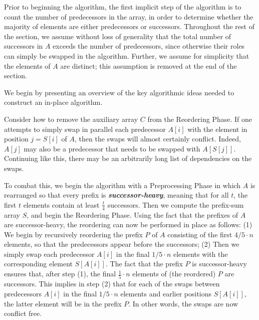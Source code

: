 \documentclass[a4paper,UKenglish,cleveref, autoref, thm-restate]{lipics-v2019}
\newcommand{\defn}[1]{{\textit{\textbf{\boldmath #1}}}}
\renewcommand{\paragraph}[1]{\vspace{0.09in}\noindent{\bf \boldmath #1.}}
\begin{document}
Prior to beginning the algorithm, the first implicit step of the
algorithm is to count the number of predecessors in the array, in
order to determine whether the majority of elements are either
predecessors or successors. Throughout the rest of the section, we
assume without loss of generality that the total number of successors
in $A$ exceeds the number of predecessors, since otherwise their roles
can simply be swapped in the algorithm. Further, we assume for
simplicity that the elements of $A$ are distinct; this assumption is
removed at the end of the section.

\paragraph{Algorithm Outline}
We begin by presenting an overview of the key algorithmic ideas needed
to construct an in-place algorithm.

Consider how to remove the auxiliary array $C$ from the Reordering
Phase. If one attempts to simply swap in parallel each predecessor
$A[i]$ with the element in position $j = S[i]$ of $A$, then the swaps
will almost certainly conflict. Indeed, $A[j]$ may also be a
predecessor that needs to be swapped with $A[S[j]]$. Continuing like
this, there may be an arbitrarily long list of dependencies on the
swaps.

To combat this, we begin the algorithm with a Preprocessing Phase in
which $A$ is rearranged so that every prefix is
\defn{successor-heavy}, meaning that for all $t$, the first $t$
elements contain at least $\frac{t}{4}$ successors. Then we compute
the prefix-sum array $S$, and begin the Reordering Phase. Using the
fact that the prefixes of $A$ are successor-heavy, the reordering can
now be performed in place as follows: (1) We begin by recursively
reordering the prefix $P$ of $A$ consisting of the first $4/5 \cdot n$
elements, so that the predecessors appear before the successors; (2)
Then we simply swap each predecessor $A[i]$ in the final $1/5 \cdot n$
elements with the corresponding element $S[A[i]]$. The fact that the
prefix $P$ is successor-heavy ensures that, after step (1), the final 
$\frac{1}{5} \cdot n$ elements of (the reordered) $P$ are successors. 
This implies in step (2) that for each of the swaps between predecessors $A[i]$
in the final $1/5 \cdot n$ elements and earlier positions $S[A[i]]$, the latter
element will be in the prefix $P$. In other words, the swaps are now conflict
free.
\end{document}

